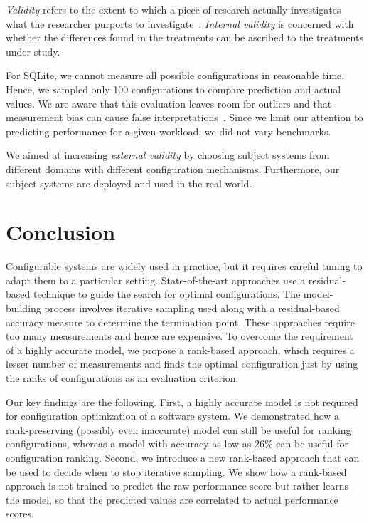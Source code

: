 \documentclass[sigconf]{acmart}
\begin{document}
{\em Validity} refers to the extent to which a piece of research actually
investigates what the researcher purports to investigate~\cite{SSA15}.
{\em Internal validity} is concerned with whether the differences found in
the treatments can be ascribed to the treatments under study. 

For SQLite, we cannot measure all possible configurations in reasonable time. Hence, we sampled only 100 configurations to compare prediction and actual values. We are aware that this evaluation leaves room for outliers and that measurement bias can cause false interpretations~\cite{me12d}. Since we limit our attention to predicting performance for a given workload, we did not vary benchmarks.



We aimed at increasing {\em external validity} by choosing subject systems from different domains with different configuration mechanisms. Furthermore, our subject systems  are deployed and used in the real world.

\section{Conclusion}
Configurable systems are widely used in practice, but it requires careful tuning to adapt them to a particular setting. State-of-the-art approaches use a residual-based technique to guide the search for optimal configurations. The model-building process involves iterative sampling used along with a residual-based accuracy measure to determine the termination point. These approaches require too many measurements and hence are expensive. To overcome the requirement of a highly accurate model, we propose a rank-based approach, which requires a lesser number of measurements and finds the optimal configuration just by using the ranks of configurations as an evaluation criterion.

Our key findings are the following. First, a highly accurate model is not required for  configuration optimization of a software system. We demonstrated how a rank-preserving (possibly even inaccurate) model can still be useful for ranking configurations, whereas a model with accuracy as low as 26\% can be useful for configuration ranking. Second, we introduce a new rank-based approach that can be used to decide when to stop iterative sampling. We show how a rank-based approach is not trained to predict the raw performance score but rather learns the model, so that the predicted values are correlated to actual performance scores.
\end{document}
